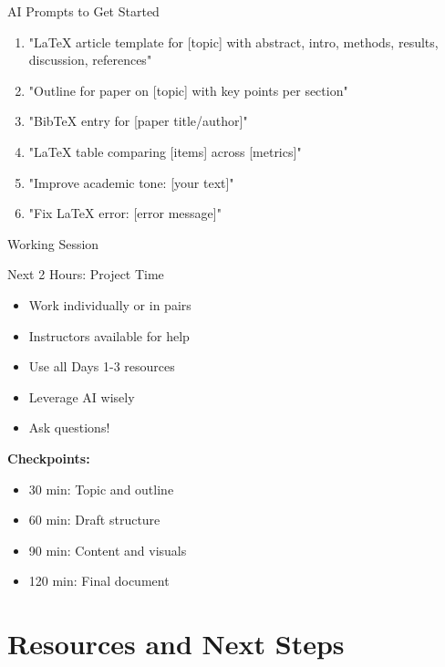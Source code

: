 \documentclass[aspectratio=169]{beamer}
\begin{document}
	\begin{frame}{AI Prompts to Get Started}
		\begin{enumerate}
			\item "LaTeX article template for [topic] with abstract, intro, methods, results, discussion, references"
			
			\item "Outline for paper on [topic] with key points per section"
			
			\item "BibTeX entry for [paper title/author]"
			
			\item "LaTeX table comparing [items] across [metrics]"
			
			\item "Improve academic tone: [your text]"
			
			\item "Fix LaTeX error: [error message]"
		\end{enumerate}
	\end{frame}
	
	\begin{frame}{Working Session}
		\begin{block}{Next 2 Hours: Project Time}
			\begin{itemize}
				\item Work individually or in pairs
				\item Instructors available for help
				\item Use all Days 1-3 resources
				\item Leverage AI wisely
				\item Ask questions!
			\end{itemize}
		\end{block}
		
		\vspace{0.5em}
		
		\textbf{Checkpoints:}
		\begin{itemize}
			\item 30 min: Topic and outline
			\item 60 min: Draft structure
			\item 90 min: Content and visuals
			\item 120 min: Final document
		\end{itemize}
	\end{frame}
	
	\section{Resources and Next Steps}
	
\end{document}
